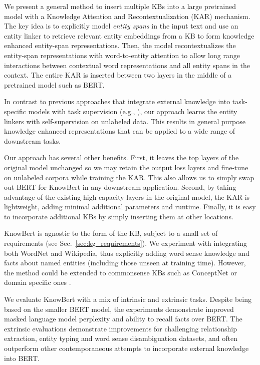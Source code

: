 \documentclass[11pt,a4paper]{article}
\newcommand{\KBS}[0]{KnowBert }
\newcommand{\BBS}[0]{BERT }
\newcommand{\BL}[0]{BERT}
\begin{document}
We present a general method to insert multiple KBs into a large pretrained model with a Knowledge Attention and Recontextualization (KAR) mechanism.
The key idea is to explicitly model \textit{entity spans} in the input text and use an entity linker to retrieve relevant entity embeddings from a KB to form knowledge enhanced entity-span representations.
Then, the model recontextualizes the entity-span representations with word-to-entity attention to allow long range interactions between contextual word representations and all entity spans in the context.
The entire KAR is inserted between two layers in the middle of a pretrained model such as BERT.

In contrast to previous approaches that integrate external knowledge into task-specific models with task supervision (e.g., \citealp{Yang2017LeveragingKB,chen2017neural}), our approach learns the entity linkers with self-supervision on unlabeled data. This results in general purpose knowledge enhanced representations that can be applied to a wide range of downstream tasks.

Our approach has several other benefits.
First, it leaves the top layers of the original model unchanged so we may retain the output loss layers and fine-tune on unlabeled corpora while training the KAR. 
This also allows us to simply swap out BERT for \KBS in any downstream application.
Second, by taking advantage of the existing high capacity layers in the original model, the KAR is lightweight, adding minimal additional parameters and runtime.
Finally, it is easy to incorporate additional KBs by simply inserting them at other locations.

\KBS is agnostic to the form of the KB, subject to a small set of requirements (see Sec.~\ref{sec:kg_requirements}).
We experiment with integrating both WordNet \cite{miller1995wordnet} and Wikipedia, thus explicitly adding word sense knowledge and facts about named entities (including those unseen at training time).  However, the method could be extended to commonsense KBs such as ConceptNet \cite{Speer2017ConceptNet5A} or domain specific ones \cite[e.g., UMLS; ][]{Bodenreider2004TheUM}.

We evaluate \KBS with a mix of intrinsic and extrinsic tasks.
Despite being based on the smaller \BBS model, the experiments demonstrate improved masked language model perplexity and ability to recall facts over \BL.
The extrinsic evaluations demonstrate improvements for challenging relationship extraction, entity typing and word sense disambiguation datasets, and often outperform other contemporaneous attempts to incorporate external knowledge into BERT. 
\end{document}
